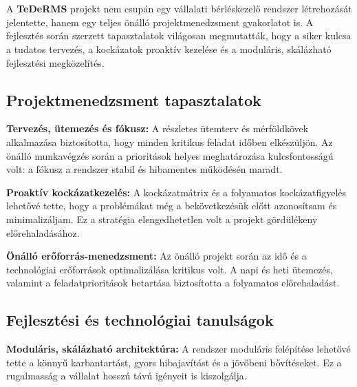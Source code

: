 \chapter{\lessons}

A \textbf{TeDeRMS} projekt nem csupán egy vállalati bérléskezelő rendszer létrehozását jelentette, 
hanem egy teljes önálló projektmenedzsment gyakorlatot is. 
A fejlesztés során szerzett tapasztalatok világosan megmutatták, hogy a siker kulcsa a tudatos tervezés, 
a kockázatok proaktív kezelése és a moduláris, skálázható fejlesztési megközelítés.

\section{Projektmenedzsment tapasztalatok}

\textbf{Tervezés, ütemezés és fókusz:}  
A részletes ütemterv és mérföldkövek alkalmazása biztosította, hogy minden kritikus feladat időben elkészüljön.  
Az önálló munkavégzés során a prioritások helyes meghatározása kulcsfontosságú volt: 
a fókusz a rendszer stabil és hibamentes működésén maradt.

\textbf{Proaktív kockázatkezelés:}  
A kockázatmátrix és a folyamatos kockázatfigyelés lehetővé tette, hogy a problémákat még a bekövetkezésük előtt azonosítsam és minimalizáljam.  
Ez a stratégia elengedhetetlen volt a projekt gördülékeny előrehaladásához.

\textbf{Önálló erőforrás-menedzsment:}  
Az önálló projekt során az idő és a technológiai erőforrások optimalizálása kritikus volt.  
A napi és heti ütemezés, valamint a feladatprioritások betartása biztosította a folyamatos előrehaladást.

\section{Fejlesztési és technológiai tanulságok}

\textbf{Moduláris, skálázható architektúra:}  
A rendszer moduláris felépítése lehetővé tette a könnyű karbantartást, gyors hibajavítást és a jövőbeni bővítéseket.  
Ez a rugalmasság a vállalat hosszú távú igényeit is kiszolgálja.

